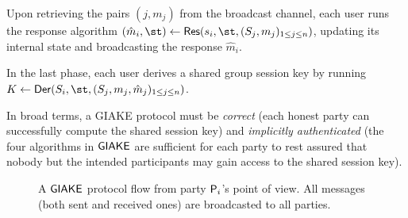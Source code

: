 \begin{plaindef}[GIAKE]
	Upon retrieving the pairs $(j,m_j)$ from the broadcast channel, each user runs the response algorithm $(\hat{m}_i,\st) \gets \GAKERes(\ssk_i,\st,(\spk_j,m_j)_{1\leq j \leq n})$, updating its internal state and broadcasting the response $\hat{m}_i$.
	
	In the last phase, each user derives a shared group session key by running $K \gets \GAKEDer (\spk_i,\st,(\spk_j,m_j,\hat{m}_j)_{1\leq j \leq n})$.
	
	In broad terms, a GIAKE protocol must be \textit{correct} (each honest party can successfully compute the shared session key) and \textit{implicitly authenticated} (the four algorithms in $\GIAKE$ are sufficient for each party to rest assured that nobody but the intended participants may gain access to the shared session key).
\end{plaindef}

\begin{figure}
	\centering 

		\caption{A $\GIAKE$ protocol flow from party $\User[i]$'s point of view. All messages (both sent and received ones) are broadcasted to all parties.}\label{fig:giakeprocedure}
\end{figure}

